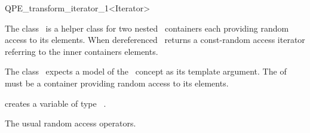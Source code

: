 
\begin{ccRefClass}{QPE_transform_iterator_1<Iterator>}

\ccDefinition
The class \ccRefName\ is a helper class for two nested \stl\ containers each
providing random access to its elements. When dereferenced \ccRefName\
returns a const-random access iterator referring to the inner containers
elements. 



\ccRequirements
\ccIndexRequirements
The class \ccRefName\ expects a model of the \stl \ concept
 as its template argument. The  of
\ccc{Iterator} must be a container providing random access to its elements.

\ccTypes \ccIndexClassTypes



\ccCreation
\ccIndexClassCreation
{}

{creates a variable of type \ccRefName\  .}

\ccUnchecked

\ccAccessFunctions
\begin{ccIndexMemberFunctions}
The usual random access operators.






\ccModifiers
{}




\end{ccIndexMemberFunctions}
\end{ccRefClass}
